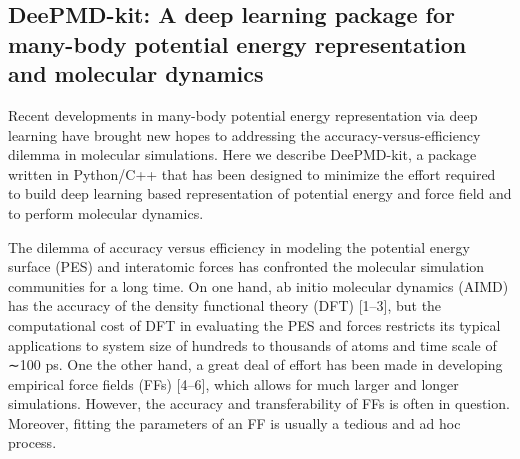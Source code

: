 \documentclass[11pt]{elegantbook}
\begin{document}
\subsection{DeePMD-kit: A deep learning package for many-body potential
energy representation and molecular dynamics}
Recent developments in many-body potential energy representation via deep learning have brought new hopes to addressing the accuracy-versus-efficiency dilemma in molecular simulations. Here we describe DeePMD-kit, a package written in Python/C++ that has been designed to minimize the effort required to build deep learning based representation of potential energy and force field and to perform molecular dynamics.

The dilemma of accuracy versus efficiency in modeling the potential energy surface (PES) and interatomic forces has confronted the molecular simulation communities for a long time. On one hand, ab initio molecular dynamics (AIMD) has the accuracy of the density functional theory (DFT) [1–3], but the computational cost of DFT in evaluating the PES and forces restricts its typical applications to system size of hundreds to thousands of atoms and time scale of ∼100 ps. One the other hand, a great deal of effort has been made in developing empirical force fields (FFs) [4–6], which allows for much larger and longer simulations. However, the accuracy and transferability of FFs is often in question. Moreover, fitting the parameters of an FF is usually a tedious and ad hoc process.
\end{document}
